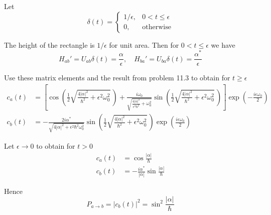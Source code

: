 


Let
\begin{equation*}
\delta(t)=\begin{cases}
1/\epsilon, & 0<t\le\epsilon
\\
0, & \text{otherwise}
\end{cases}
\end{equation*}

The height of the rectangle is $1/\epsilon$ for unit area.
Then for $0<t\le\epsilon$ we have
\begin{equation*}
H_{ab}'=U_{ab}\delta(t)=\frac{\alpha}{\epsilon},\quad
H_{ba}'=U_{ba}\delta(t)=\frac{\alpha^*}{\epsilon}
\end{equation*}

Use these matrix elements and the result from problem 11.3 to obtain for $t\ge\epsilon$
\begin{align*}
c_a(t)&=\left[
\cos\left(\frac{1}{2}\sqrt{\frac{4|\alpha|^2}{\hbar^2}+\epsilon^2\omega_0^2}\,\right)
+\frac{i\omega_0}{\sqrt{\frac{4|\alpha|^2}{\epsilon^2\hbar^2}+\omega_0^2}}
\sin\left(\frac{1}{2}\sqrt{\frac{4|\alpha|^2}{\hbar^2}+\epsilon^2\omega_0^2}\,\right)
\right]\exp\left(-\frac{i\epsilon\omega_0}{2}\right)
\\[1ex]
c_b(t)&=-\frac{2i\alpha^*}{\sqrt{4|\alpha|^2+\epsilon^2\hbar^2\omega_0^2}}
\sin\left(\frac{1}{2}\sqrt{\frac{4|\alpha|^2}{\hbar^2}+\epsilon^2\omega_0^2}\,\right)
\exp\left(\frac{i\epsilon\omega_0}{2}\right)
\end{align*}

Let $\epsilon\rightarrow0$ to obtain for $t>0$
\begin{align*}
c_a(t)&=\cos\frac{|\alpha|}{\hbar}
\\
c_b(t)&=-\frac{i\alpha^*}{|\alpha|}\sin\frac{|\alpha|}{\hbar}
\end{align*}

Hence
\begin{equation*}
P_{a\rightarrow b}=|c_b(t)|^2=\sin^2\frac{|\alpha|}{\hbar}
\end{equation*}


